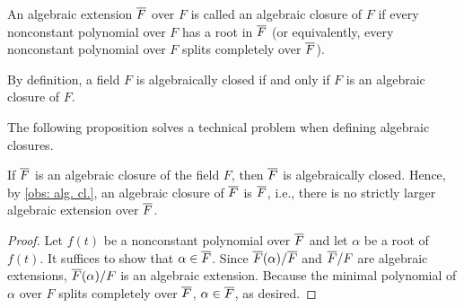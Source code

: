 \begin{defi}
    An algebraic extension $\overline{F}$ over $F$ is called an algebraic closure of $F$ if every nonconstant polynomial over $F$ has a root in $\overline{F}$ (or equivalently, every nonconstant polynomial over $F$ splits completely over $\overline{F}$).
\end{defi}
\begin{rmk}
    By definition, a field $F$ is algebraically closed if and only if $F$ is an algebraic closure of $F$.
\end{rmk}
The following proposition solves a technical problem when defining algebraic closures.
\begin{prop}
    If $\overline{F}$ is an algebraic closure of the field $F$, then $\overline{F}$ is algebraically closed.
    Hence, by \cref{obs: alg. cl.}, an algebraic closure of $\overline{F}$ is $\overline{F}$, i.e., there is no strictly larger algebraic extension over $\overline{F}$.
\end{prop}
\begin{proof}
    Let $f(t)$ be a nonconstant polynomial over $\overline{F}$ and let $\alpha$ be a root of $f(t)$.
    It suffices to show that $\alpha\in\overline{F}$.
    Since $\overline{F}(\alpha)/\overline{F}$ and $\overline{F}/F$ are algebraic extensions, $\overline{F}(\alpha)/F$ is an algebraic extension.
    Because the minimal polynomial of $\alpha$ over $F$ splits completely over $\overline{F}$, $\alpha\in\overline{F}$, as desired.
\end{proof}

